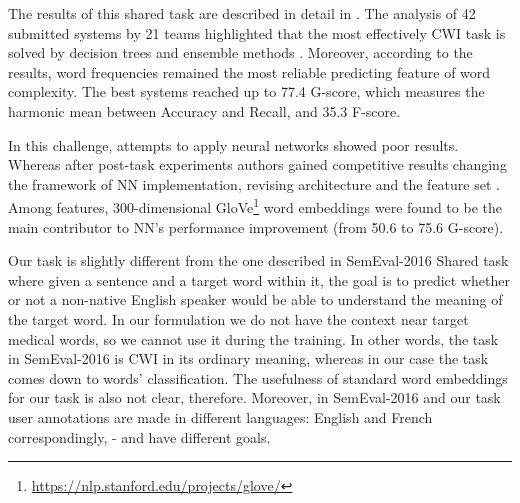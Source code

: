 The results of this shared task are described in detail in \cite{Paetzold-SemEval2016overview}. The analysis of 42 submitted systems by 21 teams highlighted that the most effectively CWI task is solved by decision trees \citep{Malmasi-SemEval2016} and ensemble methods \citep{Paetzold-SemEval2016solution, Ronzano-SemEval2016}. Moreover, according to the results, word frequencies remained the most reliable predicting feature of word complexity. The best systems reached up to 77.4 G-score, which measures the harmonic mean between Accuracy and Recall, and 35.3 F-score. 

In this challenge, attempts to apply neural networks showed poor results. Whereas after post-task experiments authors gained competitive results changing the framework of NN implementation, revising architecture and the feature set \citep{Bingel-SemEval2016}. Among features, 300-dimensional GloVe\footnote{\url{https://nlp.stanford.edu/projects/glove/}} word embeddings were found to be the main contributor to NN's performance improvement (from 50.6 to 75.6 G-score). 

Our task is slightly different from the one described in SemEval-2016 Shared task \citep{Paetzold-SemEval2016overview} where given a sentence and a target word within it, the goal is to predict whether or not a non-native English speaker would be able to understand the meaning of the target word. In our formulation we do not have the context near target medical words, so we cannot use it during the training. In other words, the task in SemEval-2016 is CWI in its ordinary meaning, whereas in our case the task comes down to words' classification. The usefulness of standard word embeddings for our task is also not clear, therefore. Moreover, in SemEval-2016 and our task user annotations are made in different languages: English and French correspondingly, -  and have different goals.

